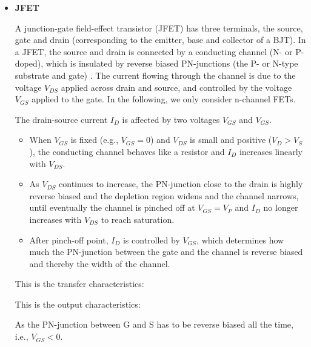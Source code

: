 \begin{itemize}
{\bf Example:} Implement logic function $f(a,b,c)=(a'+b')c$ by a CMOS circuit.

First, find the complementary function $f'(a,b,c)$:
\[
f'(a,b,c)=[(a'+b')c]'=(a'+b')'+c'=ab+c' 
\]
and then the CMOS circuit can be designed as shown:










\item {\bf JFET}

A junction-gate field-effect transistor (JFET) has three terminals, the 
source, gate and drain (corresponding to the emitter, base and collector 
of a BJT). In a JFET, the source and drain is connected by a conducting 
channel (N- or P-doped), which is insulated by reverse biased PN-junctions 
(the P- or N-type substrate and gate) . The current flowing through the
channel is due to the voltage $V_{DS}$ applied across drain and source, 
and controlled by the voltage $V_{GS}$ applied to the gate. In the following,
we only consider n-channel FETs.


The drain-source current $I_D$ is affected by two voltages $V_{GS}$
and $V_{GS}$. 
\begin{itemize}
\item When $V_{GS}$ is fixed (e.g., $V_{GS}=0$) and $V_{DS}$ is small
	and positive ($V_D>V_S$), the conducting channel behaves like a
	resistor and $I_D$ increases linearly with $V_{DS}$.
\item As $V_{DS}$ continues to increase, the PN-junction close to the 
	drain is highly reverse biased and the depletion region widens
	and the channel narrows, until eventually the channel is pinched 
	off at $V_{GS}=V_P$ and $I_D$ no longer increases with $V_{DS}$ 
	to reach saturation.
\item After pinch-off point, $I_D$ is controlled by $V_{GS}$, which
	determines how much the PN-junction between the gate and the 
	channel is reverse biased and thereby the width of the channel.
\end{itemize}

This is the transfer characteristics:

This is the output characteristics:

As the PN-junction between G and S has to be reverse biased all the time, 
i.e., $V_{GS}<0$. 



\end{itemize}
